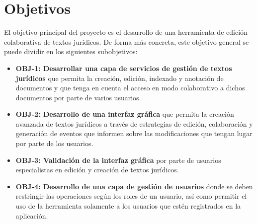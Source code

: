 \section{Objetivos}
El objetivo principal del proyecto es el desarrollo de una herramienta de edición colaborativa de textos jurídicos. De forma más concreta, este objetivo general se puede dividir en los siguientes subobjetivos:
\begin{itemize}
\item {\bf OBJ-1: Desarrollar una capa de servicios de gestión de textos jurídicos} que permita la creación, edición, indexado y anotación de documentos y que tenga en cuenta el acceso en modo colaborativo a dichos documentos por parte de varios usuarios.
\item {\bf OBJ-2: Desarrollo de una interfaz gráfica} que permita la creación avanzada de textos jurídicos a través de estrategias de edición, colaboración y generación de eventos que informen sobre las modificaciones que tengan lugar por parte de los usuarios.
\item {\bf OBJ-3: Validación de la interfaz gráfica} por parte de usuarios especialistas en edición y creación de textos jurídicos.
\item {\bf OBJ-4: Desarrollo de una capa de gestión de usuarios} donde se deben restringir las operaciones según los roles de un usuario, así como permitir el uso de la herramienta solamente a los usuarios que estén registrados en la aplicación.
\end{itemize}